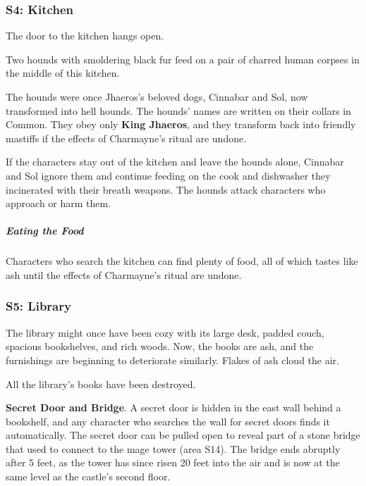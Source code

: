 \documentclass[10pt,a4paper,twoside,bg=print,twocolumn,openany,nodeprecatedcode]{dndbook}
\begin{document}
\subsubsection{S4: Kitchen}
The door to the kitchen hangs open.

\begin{DndReadAloud}{}
Two hounds with smoldering black fur feed on a pair of charred human corpses in the middle of this kitchen.

\end{DndReadAloud}

The hounds were once Jhaeros's beloved dogs, Cinnabar and Sol, now transformed into hell hounds. The hounds' names are written on their collars in Common. They obey only \textbf{King Jhaeros}, and they transform back into friendly mastiffs if the effects of Charmayne's ritual are undone.

If the characters stay out of the kitchen and leave the hounds alone, Cinnabar and Sol ignore them and continue feeding on the cook and dishwasher they incinerated with their breath weapons. The hounds attack characters who approach or harm them.

\subparagraph{Eating the Food}
Characters who search the kitchen can find plenty of food, all of which tastes like ash until the effects of Charmayne's ritual are undone.

\subsubsection{S5: Library}
\begin{DndReadAloud}{}
The library might once have been cozy with its large desk, padded couch, spacious bookshelves, and rich woods. Now, the books are ash, and the furnishings are beginning to deteriorate similarly. Flakes of ash cloud the air.

\end{DndReadAloud}

All the library's books have been destroyed.

\textbf{Secret Door and Bridge}. A secret door is hidden in the east wall behind a bookshelf, and any character who searches the wall for secret doors finds it automatically. The secret door can be pulled open to reveal part of a stone bridge that used to connect to the mage tower (area S14). The bridge ends abruptly after 5 feet, as the tower has since risen 20 feet into the air and is now at the same level as the castle's second floor.
\end{document}
